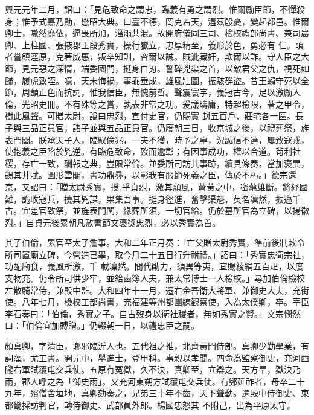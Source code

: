 \begin{pinyinscope}
 興元元年二月，詔曰：「見危致命之謂忠，臨義有勇之謂烈。惟爾勵臣節，不憚殺身；惟予式嘉乃勛，懋昭大典。曰臺不德，罔克若天，遘茲殷憂，變起都邑。惟爾卿士，嗷然靡依，逼畏所加，淄澠共混。故開府儀同三司、檢校禮部尚書、兼司農卿、上柱國、張掖郡王段秀實，操行嶽立，忠厚精至，義形於色，勇必有
 仁。頃者嘗鎮涇原，克著威惠，叛卒知訓，咨爾以誠。賊泚藏奸，欺爾以詐。守人臣之大節，見元惡之深情，端委國門，挺身白刃。誓碎兇渠之首，以敵君父之仇，視死如歸，履虎致咥。噫，天未悔禍，事乖垂成，雄風壯圖，振駭群盜。昔王蠋守死以全節，周顗正色而抗詞，惟我信臣，無愧前哲。聲震寰宇，義冠古今，足以激勵人倫，光昭史冊。不有殊等之賞，孰表非常之功。爰議疇庸，特超檢限，著之甲令，樹此風聲。可贈太尉，謚曰忠烈，宣付史官，仍賜實
 封五百戶、莊宅各一區。長子與三品正員官，諸子並與五品正員官。仍廢朝三日，收京城之後，以禮葬祭，旌表門閭。朕承天子人，臨馭億兆，一夫不獲，時予之辜，況誠信不達，屢致寇戎，使抱義之臣陷於兇逆。有臨危致命，歿而逾彰；有因事成功，權以合道。茍利社稷，存亡一致，酬報之典，豈限常倫。並委所司訪其事跡，續具條奏，當加褒異，錫其井賦。圖形雲閣，書功鼎彞，以彰我有服節死義之臣，傳於不朽。」德宗還京，又詔曰：「贈太尉秀實，授
 乎貞烈，激其頹風，蒼黃之中，密蘊雄斷。將紓國難，詭收寇兵，撓其兇謀，果集吾事。挺身徑進，奮擊渠魁，英名凜然，振邁千古。宜差官致祭，並旌表門閭，緣葬所須，一切官給。仍於墓所官為立碑，以揚徽烈。」自貞元後累朝凡赦書節文褒獎忠烈，必以秀實為首。



 其子伯倫，累官至太子詹事。大和二年正月奏：「亡父贈太尉秀實，準前後制敕令所司置廟立碑，今營造已畢，取今月二十五日行升祔禮。」詔曰：「秀實忠衛宗社，功配廟食，義風所激，千
 載凜然。間代勛力，須異等夷，宜賜綾絹五百疋，以度支物充。仍令所司供少牢，並給鹵簿人夫，兼太常博士一人檢校。」尋加伯倫檢校左散騎常侍，兼殿中監。大和四年十一月，遷右金吾衛大將軍、兼御史大夫，充街使。八年七月，檢校工部尚書，充福建等州都團練觀察使，入為太僕卿，卒。宰臣李石奏曰：「伯倫，秀實之子。自古歿身以衛社稷者，無如秀實之賢。」文宗憫然曰：「伯倫宜加賻贈。」仍輟朝一日，以禮忠臣之嗣。



 顏真卿，字清臣，瑯邪臨沂人也。五代祖之推，北齊黃門侍郎。真卿少勤學業，有詞藻，尤工書。開元中，舉進士，登甲科。事親以孝聞。四命為監察御史，充河西隴右軍試覆屯交兵使。五原有冤獄，久不決，真卿至，立辯之。天方旱，獄決乃雨，郡人呼之為「御史雨」。又充河東朔方試覆屯交兵使。有鄭延祚者，母卒二十九年，殯僧舍垣地，真卿劾奏之，兄弟三十年不齒，天下聳動。遷殿中侍御史、東都畿採訪判官，轉侍御史、武部員外郎。楊國忠怒其
 不附己，出為平原太守。




\end{pinyinscope}
